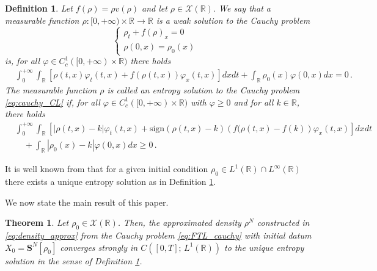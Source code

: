 \documentclass[reqno,oneside]{amsart}
\theoremstyle{plain}
\newtheorem{theorem}{Theorem}[section]
\newtheorem{definition}{Definition}[section]
\newcommand{\R}{\mathbb{R}}
\newcommand{\sam}{\mathbf{S}}
\begin{document}
\begin{definition}\label{def:entropy}
    Let $f(\rho)=\rho v(\rho)$ and let $\rho\in \mathcal{X}(\R)$. We say that a measurable function $\rho:[0,+\infty)\times \R\rightarrow \R$ is a weak solution to the Cauchy problem
    \begin{equation}\label{eq:cauchy_CL}
    \begin{cases}
    \rho_t+f(\rho)_x = 0 & \\
    \rho(0,x)=\rho_0(x)
    \end{cases}
    \end{equation}
    is, for all $\varphi\in C^1_c([0,+\infty)\times \R)$ there holds
    \begin{align}
        & \int_0^{+\infty}\int_\R \left[\rho(t,x)\varphi_t(t,x)+f(\rho(t,x))\varphi_x(t,x)\right]dx dt+\int_\R\rho_0(x)\varphi(0,x)dx = 0\,.\label{eq:weak}
    \end{align}
    The measurable function $\rho$ is called an entropy solution to the Cauchy problem \eqref{eq:cauchy_CL} if, for all $\varphi\in C^1_c([0,+\infty)\times \R)$ with $\varphi\geq 0$ and for all $k\in \R$,  there holds
 \begin{align}
        & \int_0^{+\infty}\int_\R \left[\left|\rho(t,x)-k\right|\varphi_t(t,x)+\mathrm{sign}(\rho(t,x)-k)\left(f(\rho(t,x)-f(k)\right)\varphi_x(t,x)\right]dx dt\nonumber\\
        & \quad +\int_\R\left|\rho_0(x)-k\right|\varphi(0,x)dx \geq 0\,.\label{eq:entropy}
    \end{align}
\end{definition}
It is well known from \cite{kruzkov} that for a given initial condition $\rho_0\in L^1(\R)\cap L^\infty(\R)$ there exists a unique entropy solution as in Definition \ref{def:entropy}.

\medskip
We now state the main result of this paper.
\begin{theorem}\label{thm:main}
    Let $\rho_0\in \mathcal{X}(\R)$. Then, the approximated density $\rho^N$ constructed in \eqref{eq:density_approx} from the Cauchy problem \eqref{eq:FTL_cauchy} with initial datum $X_0=\sam^N[\rho_0]$ converges strongly in $C([0,T];\,L^1(\R))$ to the unique entropy solution in the sense of Definition \ref{def:entropy}.
\end{theorem}
\end{document}
